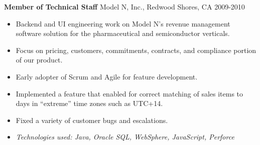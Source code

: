 \textbf{Member of Technical Staff}
Model N, Inc., Redwood Shores, CA \hfill 2009-2010
\begin{itemize} \itemsep -2pt %
\item Backend and UI engineering work on Model N's revenue management
      software solution for the pharmaceutical and semiconductor verticals.
\item Focus on pricing, customers, commitments, contracts, and compliance
      portion of our product.
\item Early adopter of Scrum and Agile for feature development.
\item Implemented a feature that enabled for correct matching of sales
      items to days in ``extreme'' time zones such as UTC+14.
\item Fixed a variety of customer bugs and escalations.

\item \textit{Technologies used: Java, Oracle SQL, WebSphere, JavaScript,
      Perforce}

\end{itemize}
